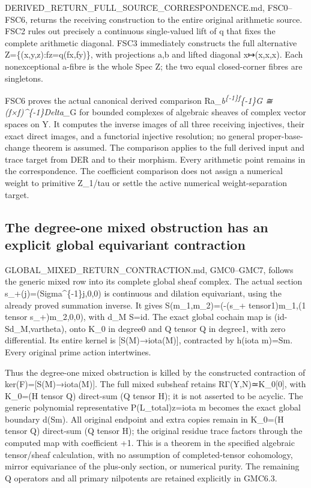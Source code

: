 DERIVED\_RETURN\_FULL\_SOURCE\_CORRESPONDENCE.md, FSC0--FSC6, returns
the receiving construction to the entire original arithmetic source.
FSC2 rules out precisely a continuous single-valued lift of q that fixes
the complete arithmetic diagonal. FSC3 immediately constructs the full
alternative Z=\{(x,y,z):fz=q(fx,fy)\}, with projections a,b and lifted
diagonal x↦(x,x,x). Each nonexceptional a-fibre is the whole Spec Z; the
two equal closed-corner fibres are singletons.

FSC6 proves the actual canonical derived comparison
Ra\_\emph{b\textsuperscript{\{-1\}f}\{-1\}G ≅ (f×f)\^{}\{-1\}Delta\_}G
for bounded complexes of algebraic sheaves of complex vector spaces on
Y. It computes the inverse images of all three receiving injectives,
their exact direct images, and a functorial injective resolution; no
general proper-base-change theorem is assumed. The comparison applies to
the full derived input and trace target from DER and to their morphism.
Every arithmetic point remains in the correspondence. The coefficient
comparison does not assign a numerical weight to primitive Z\_1/tau or
settle the active numerical weight-separation target.

\subsection{The degree-one mixed obstruction has an explicit global
equivariant
contraction}\label{the-degree-one-mixed-obstruction-has-an-explicit-global-equivariant-contraction-1}

GLOBAL\_MIXED\_RETURN\_CONTRACTION.md, GMC0--GMC7, follows the generic
mixed row into its complete global sheaf complex. The actual section
s\_+(j)=(Sigma\^{}\{-1\}j,0,0) is continuous and dilation equivariant,
using the already proved summation inverse. It gives
S(m\_1,m\_2)=(-(s\_+ tensor1)m\_1,(1 tensor s\_+)m\_2,0,0), with d\_M
S=id. The exact global cochain map is (id-Sd\_M,vartheta), onto K\_0 in
degree0 and Q tensor Q in degree1, with zero differential. Its entire
kernel is {[}S(M)→iota(M){]}, contracted by h(iota m)=Sm. Every original
prime action intertwines.

Thus the degree-one mixed obstruction is killed by the constructed
contraction of ker(F)={[}S(M)→iota(M){]}. The full mixed subsheaf
retains RΓ(Y,N)≃K\_0{[}0{]}, with K\_0=(H tensor Q) direct-sum (Q tensor
H); it is not asserted to be acyclic. The generic polynomial
representative P(L\_total)z=iota m becomes the exact global boundary
d(Sm). All original endpoint and extra copies remain in K\_0=(H tensor
Q) direct-sum (Q tensor H); the original residue trace factors through
the computed map with coefficient +1. This is a theorem in the specified
algebraic tensor/sheaf calculation, with no assumption of
completed-tensor cohomology, mirror equivariance of the plus-only
section, or numerical purity. The remaining Q operators and all primary
nilpotents are retained explicitly in GMC6.3.

